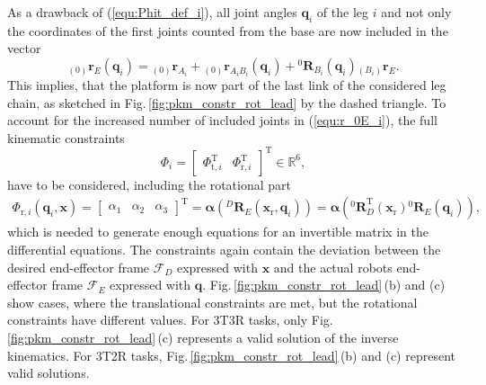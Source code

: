 \documentclass[robotics,article,submit,moreauthors,pdftex]{Definitions/mdpi}
\newcommand{\bm}[1]{\boldsymbol{#1}}
\newcommand{\ortvek}[4]{{ }_{(#1)}{\boldsymbol{#2}}^{#3}_{#4} }
\newcommand{\rotmat}[2]{{{ }^{#1}\boldsymbol{R}}_{#2}}
\newcommand{\transp}[0]{{\mathrm{T}}}
\newcommand{\ks}[1]{{\mathcal{F}}_{#1}}
\let\Phi\varPhi
\begin{document}
As a drawback of (\ref{equ:Phit_def_i}), all joint angles $\bm{q}_i$ of the leg $i$ and not only the coordinates of the first joints counted from the base are now included in the vector
%
\begin{equation}
\ortvek{0}{r}{}{E}(\bm{q}_i) = 
\ortvek{0}{r}{}{A_i}
+ \ortvek{0}{r}{}{A_iB_i}(\bm{q}_i) + \rotmat{0}{B_i}(\bm{q}_i) \ortvek{B_i}{r}{}{E}.
\label{equ:r_0E_i}
\end{equation}
%
This implies, that the platform is now part of the last link of the considered leg chain, as sketched in Fig.\,\ref{fig:pkm_constr_rot_lead} by the dashed triangle.
To account for the increased number of included joints in (\ref{equ:r_0E_i}), the full kinematic constraints
%
\begin{equation}
\bm{\Phi}_i=\begin{bmatrix}
\bm{\Phi}_{\mathrm{t},i}^\transp & \bm{\Phi}_{\mathrm{r},i}^\transp
\end{bmatrix}^\transp \in {\mathbb{R}}^{6},
\label{equ:Phi_def}
\end{equation}
%
have to be considered, including the rotational part
%
\begin{align}
\bm{\Phi}_{\mathrm{r},i}(\bm{q}_i,\bm{x})
=
\begin{bmatrix}
\alpha_1 & \alpha_2 & \alpha_3
\end{bmatrix}^\transp
=
\bm{\alpha}\left(\rotmat{D}{E}(\bm{x}_{\mathrm{r}},\bm{q}_i)\right)
=
\bm{\alpha}\left(\rotmat{0}{D}^\transp (\bm{x}_{\mathrm{r}})\rotmat{0}{E}(\bm{q}_i)\right),
\label{equ:Phir_def_i}
\end{align}
%
which is needed to generate enough equations for an invertible matrix in the differential equations.
The constraints again contain the deviation between the desired end-effector frame $\ks{D}$ expressed with $\bm{x}$ and the actual robots end-effector frame $\ks{E}$ expressed with $\bm{q}$.
Fig.\,\ref{fig:pkm_constr_rot_lead}\,(b) and (c) show cases, where the translational constraints are met, but the rotational constraints have different values.
For 3T3R tasks, only Fig.\,\ref{fig:pkm_constr_rot_lead}\,(c) represents a valid solution of the inverse kinematics. For 3T2R tasks, Fig.\,\ref{fig:pkm_constr_rot_lead}\,(b) and (c) represent valid solutions.
\end{document}
